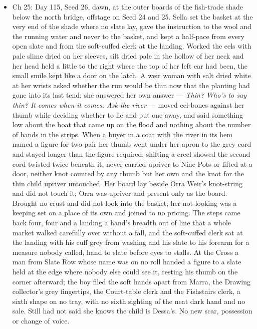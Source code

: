 \documentclass{design/chronicle}
\begin{document}
{\begin{itemize}[leftmargin=1.4em,itemsep=1pt,topsep=3pt,parsep=0pt]
\item Ch 25: Day 115, Seed 26, dawn, at the outer boards of the fish-trade shade below the north bridge, offstage on Seed 24 and 25. Sella set the basket at the very end of the shade where no slate lay, gave the instruction to the wool and the running water and never to the basket, and kept a half-pace from every open slate and from the soft-cuffed clerk at the landing. Worked the eels with pale slime dried on her sleeves, silt dried pale in the hollow of her neck and her head held a little to the right where the top of her left ear had been, the small smile kept like a door on the latch. A weir woman with salt dried white at her wrists asked whether the run would be thin now that the planting had gone into its last tend; she answered her own answer — \emph{Thin? Who’s to say thin? It comes when it comes. Ask the river} — moved eel-bones against her thumb while deciding whether to lie and put one away, and said something low about the boat that came up on the flood and nothing about the number of hands in the strips. When a buyer in a coat with the river in its hem named a figure for two pair her thumb went under her apron to the grey cord and stayed longer than the figure required; shifting a creel showed the second cord twisted twice beneath it, never carried upriver to Nine Pots or lifted at a door, neither knot counted by any thumb but her own and the knot for the thin child upriver untouched. Her board lay beside Orra Weir’s knot-string and did not touch it; Orra was upriver and present only as the board. Brought no crust and did not look into the basket; her not-looking was a keeping set on a place of its own and joined to no pricing. The steps came back four, four and a landing a hand’s breadth out of line that a whole market walked carefully over without a fall, and the soft-cuffed clerk sat at the landing with his cuff grey from washing and his slate to his forearm for a measure nobody called, hand to slate before eyes to stalls. At the Cross a man from Slate Row whose name was on no roll handed a figure to a slate held at the edge where nobody else could see it, resting his thumb on the corner afterward; the boy filed the soft hands apart from Marra, the Drawing collector’s grey fingertips, the Court-table clerk and the Fishstairs clerk, a sixth shape on no tray, with no sixth sighting of the neat dark hand and no sale. Still had not said she knows the child is Dessa’s. No new scar, possession or change of voice.

\end{itemize}

}
\end{document}
